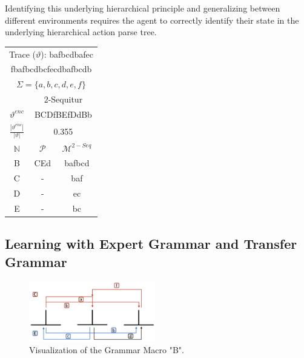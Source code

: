 \documentclass[colorinlistoftodos]{article}
\theoremstyle{definition}
\begin{document}
Identifying this underlying hierarchical principle and generalizing between different environments requires the agent to correctly identify their state in the underlying hierarchical action parse tree.

    \begin{tabular}{c | c c |} %
\hline\hline %
 \multicolumn{3}{c}{Trace ($\vartheta$): bafbcdbafec} \\
 \multicolumn{3}{c}{fbafbcdbcfecdbafbcdb}\\
\hline
\multicolumn{3}{c}{$\Sigma = \{a,b,c,d,e,f\}$}\\
\hline\hline
  & \multicolumn{2}{c}{$2$-Sequitur}\\
\hline
 $\vartheta^{enc}$ & \multicolumn{2}{c}{BCDfBEfDdBb}\\
 $\frac{|\vartheta^{enc}|}{|\vartheta|}$ & \multicolumn{2}{c}{0.355} \\
\hline \hline
$\mathbb{N}$ & $\mathcal{P}$ & $\mathcal{M}^{2-Seq}$ \\ %
\hline %
B & CEd & bafbcd\\
C & - & baf\\
D & - & ec\\
E & - & bc\\ 
\hline %
\end{tabular}
\subsection{Learning with Expert Grammar and Transfer Grammar}


\begin{figure}
  \begin{center}
    \includegraphics[width=0.49\textwidth]{figures/grammar_macro_viz}
  \end{center}
  \caption{Visualization of the Grammar Macro "B".}
  \label{fig:grammar_macro}
\end{figure}
\end{document}
